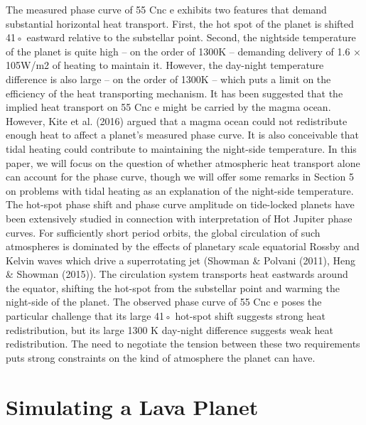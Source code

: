 The measured phase curve of 55 Cnc e exhibits two
features that demand substantial horizontal heat transport. First, the hot spot of the planet is shifted 41◦
eastward relative to the substellar point. Second, the nightside temperature of the planet is quite high – on the
order of 1300K – demanding delivery of 1.6 × 105W/m2
of heating to maintain it. However, the day-night temperature difference is also large – on the order of 1300K
– which puts a limit on the efficiency of the heat transporting mechanism.
It has been suggested that the implied heat transport on 55 Cnc e might be carried by the magma ocean.
However, Kite et al. (2016) argued that a magma ocean
could not redistribute enough heat to affect a planet’s
measured phase curve. It is also conceivable that tidal
heating could contribute to maintaining the night-side
temperature. In this paper, we will focus on the question of whether atmospheric heat transport alone can
account for the phase curve, though we will offer some
remarks in Section 5 on problems with tidal heating as
an explanation of the night-side temperature.
The hot-spot phase shift and phase curve amplitude on tide-locked planets have been extensively studied in connection with interpretation of Hot Jupiter
phase curves. For sufficiently short period orbits,
the global circulation of such atmospheres is dominated by the effects of planetary scale equatorial
Rossby and Kelvin waves which drive a superrotating jet (Showman & Polvani (2011), Heng & Showman
(2015)). The circulation system transports heat eastwards around the equator, shifting the hot-spot from
the substellar point and warming the night-side of the
planet. The observed phase curve of 55 Cnc e poses
the particular challenge that its large 41◦ hot-spot shift
suggests strong heat redistribution, but its large 1300
K day-night difference suggests weak heat redistribution. The need to negotiate the tension between these
two requirements puts strong constraints on the kind of
atmosphere the planet can have.






\section{Simulating a Lava Planet}




